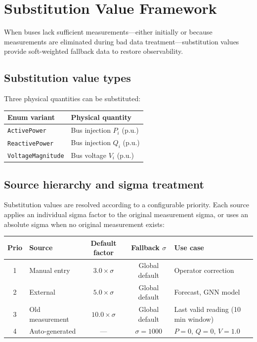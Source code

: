 \documentclass[11pt,a4paper]{article}
\begin{document}
\section{Substitution Value Framework}\label{sec:subst}

When buses lack sufficient measurements---either initially or because
measurements are eliminated during bad data treatment---substitution
values provide soft-weighted fallback data to restore observability.

\subsection{Substitution value types}

Three physical quantities can be substituted:

\begin{center}
\begin{tabular}{ll}
  \toprule
  \textbf{Enum variant} & \textbf{Physical quantity} \\
  \midrule
  \texttt{ActivePower}      & Bus injection $P_i$ (p.u.) \\
  \texttt{ReactivePower}    & Bus injection $Q_i$ (p.u.) \\
  \texttt{VoltageMagnitude} & Bus voltage $V_i$ (p.u.) \\
  \bottomrule
\end{tabular}
\end{center}

\subsection{Source hierarchy and sigma treatment}

Substitution values are resolved according to a configurable priority.
Each source applies an individual sigma factor to the original measurement
sigma, or uses an absolute sigma when no original measurement exists:

\begin{center}
\small
\begin{tabular}{clccp{30mm}}
  \toprule
  \textbf{Prio} & \textbf{Source} & \textbf{Default factor}
    & \textbf{Fallback $\sigma$} & \textbf{Use case} \\
  \midrule
  1 & Manual entry    & $3.0 \times \sigma$
    & Global default & Operator correction \\
  2 & External        & $5.0 \times \sigma$
    & Global default & Forecast, GNN model \\
  3 & Old measurement & $10.0 \times \sigma$
    & Global default & Last valid reading
      (10\,min window) \\
  4 & Auto-generated  & --- & $\sigma = 1000$
    & $P{=}0$, $Q{=}0$, $V{=}1.0$ \\
  \bottomrule
\end{tabular}
\end{center}
\end{document}
